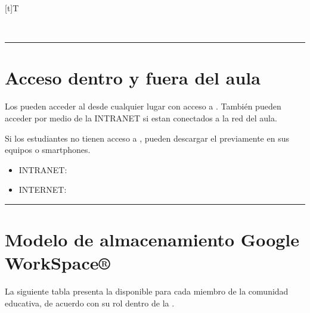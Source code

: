 \documentclass[letterpaper,10pt,spanish]{sphinxmanual}
\let\sphinxpxdimen\pdfpxdimen\else\newdimen\sphinxpxdimen
\begin{document}
\begin{savenotes}\sphinxattablestart
\sphinxthistablewithglobalstyle
\centering
\begin{tabulary}{\linewidth}[t]{T}
\sphinxtoprule
\sphinxtableatstartofbodyhook

\begin{sphinxfigure-in-table}
\centering
\capstart
\noindent\sphinxincludegraphics[width=400\sphinxpxdimen]{{sello}.png}
\label{\detokenize{0_intro/informacion:id1}}\end{sphinxfigure-in-table}\relax
\\
\sphinxbottomrule
\end{tabulary}
\sphinxtableafterendhook\par
\sphinxattableend\end{savenotes}


\bigskip\hrule\bigskip



\section{Acceso dentro y fuera del aula}
\label{\detokenize{0_intro/informacion:acceso-dentro-y-fuera-del-aula}}
\sphinxAtStartPar
Los  pueden acceder al  desde cualquier lugar con acceso a . También pueden acceder por medio de la INTRANET si estan conectados a la red del aula.

\sphinxAtStartPar
Si los estudiantes no tienen acceso a , pueden descargar el  previamente en sus equipos o smartphones.
\begin{itemize}
\item {} 
\sphinxAtStartPar
INTRANET: 

\item {} 
\sphinxAtStartPar
INTERNET: 

\end{itemize}


\bigskip\hrule\bigskip



\section{Modelo de almacenamiento Google WorkSpace®}
\label{\detokenize{0_intro/informacion:modelo-de-almacenamiento-google-workspace}}
\sphinxAtStartPar
La siguiente tabla presenta la  disponible para cada miembro de la comunidad educativa, de acuerdo con su rol dentro de la .
\end{document}
